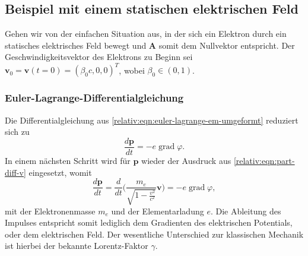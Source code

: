 \subsection{Beispiel mit einem statischen elektrischen Feld
\label{relativ:section:teilchen-konst-e-feld}}

Gehen wir von der einfachen Situation aus,
in der sich ein Elektron durch ein statisches
elektrisches Feld bewegt und \(\bm{A}\)
somit dem Nullvektor entspricht.
Der Geschwindigkeitsvektor des Elektrons zu Beginn sei
\(\bm{v}_0 = \bm{v}(t=0) =(\beta_0 c, 0, 0)^T\), wobei
\(\beta_0 \in (0, 1)\).

\subsubsection{Euler-Lagrange-Differentialgleichung}
Die Differentialgleichung aus \eqref{relativ:eqn:euler-lagrange-em-umgeformt} reduziert sich zu
\begin{equation}
    \frac{d\bm{p}}{dt} =
    - e \operatorname{grad} \varphi.
    \label{relativ:eqn:euler-lagrange-bsp-1}
\end{equation}
In einem nächsten Schritt wird für \(\bm{p}\)
wieder der Ausdruck aus \eqref{relativ:eqn:part-diff-v} eingesetzt,
womit
\begin{equation}
    \frac{d\bm{p}}{dt} =
    \frac{d}{dt} \Biggl(\frac{m_e}{\sqrt{1-\frac{v^2}{c^2}}} \bm{v}\Biggr) =
    - e \operatorname{grad} \varphi,
    \label{relativ:eqn:euler-lagrange-bsp-eingesetzt}
\end{equation}
mit der Elektronenmasse \(m_e\) und der Elementarladung \(e\).
Die Ableitung des Impulses entspricht somit lediglich
dem Gradienten des elektrischen Potentials, oder dem elektrischen Feld.
Der wesentliche Unterschied zur klassischen Mechanik ist hierbei
der bekannte Lorentz-Faktor \(\gamma\).

